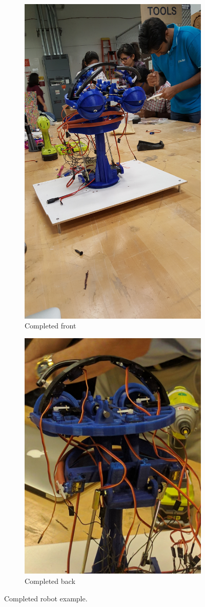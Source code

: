 \documentclass[index=totoc,hyperref,openany]{labbook} %
\begin{document}
\begin{figure}[H] %
\begin{subfigure}{.5\textwidth}
  \centering
  \includegraphics[width=.42\linewidth]{completed}
  \caption{Completed front}
  \label{fig:completed_robot_a}
\end{subfigure}%
\begin{subfigure}{.5\textwidth}
  \centering
  \includegraphics[width=.55\linewidth]{completed_back}
  \caption{Completed back}
  \label{fig:completed_robot_b}
\end{subfigure}
\caption{Completed robot example.}
\label{fig:completed_robot}
\end{figure}
\end{document}
